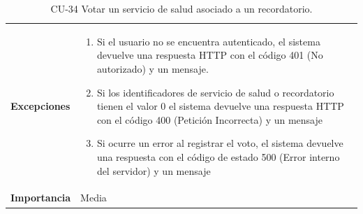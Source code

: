 \begin{table}[p]
\begin{tabularx}{\linewidth}{ p{} p{} }
		\textbf{Excepciones}          & 
            \begin{enumerate}
			\def\labelenumi{\arabic{enumi}.}
			\tightlist
   			\item Si el usuario no se encuentra autenticado, el sistema devuelve 
                       una respuesta HTTP con el código 401 (No autorizado) y un mensaje.
                \item   Si los identificadores de servicio de salud o recordatorio tienen el valor 0 el sistema devuelve una respuesta HTTP con el código 400 (Petición Incorrecta) y un mensaje
                \item Si ocurre un error al registrar el voto, el sistema devuelve una respuesta con el código de estado 500 (Error interno del servidor) y un mensaje
            \end{enumerate}\\
		\textbf{Importancia}          & Media \\
		\bottomrule
	\end{tabularx}
	\caption{CU-34 Votar un servicio de salud asociado a un recordatorio.}
\end{table}

